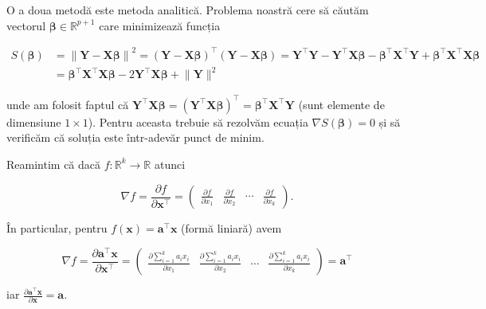 \documentclass[]{article}
\begin{document}
O a doua metodă este metoda analitică. Problema noastră cere să căutăm
vectorul \(\boldsymbol \beta\in\mathbb{R}^{p+1}\) care minimizează
funcția

\begin{align*}
S(\boldsymbol \beta) &= \left\lVert \boldsymbol Y - \boldsymbol X \boldsymbol\beta\right\rVert^2 = \left(\boldsymbol Y - \boldsymbol X \boldsymbol\beta\right)^\intercal\left(\boldsymbol Y - \boldsymbol X \boldsymbol\beta\right) = \boldsymbol Y^\intercal \boldsymbol Y - \boldsymbol Y^\intercal \boldsymbol X \boldsymbol\beta - \boldsymbol \beta^\intercal \boldsymbol X^\intercal \boldsymbol Y + \boldsymbol \beta^\intercal \boldsymbol X^\intercal \boldsymbol X \boldsymbol\beta \\
  & = \boldsymbol \beta^\intercal \boldsymbol X^\intercal \boldsymbol X \boldsymbol\beta - 2 \boldsymbol Y^\intercal \boldsymbol X \boldsymbol\beta + \lVert  \boldsymbol Y \rVert^2
\end{align*}

unde am folosit faptul că
\(\boldsymbol Y^\intercal \boldsymbol X \boldsymbol\beta = \left(\boldsymbol Y^\intercal \boldsymbol X \boldsymbol\beta\right)^\intercal = \boldsymbol \beta^\intercal \boldsymbol X^\intercal \boldsymbol Y\)
(sunt elemente de dimensiune \(1\times 1\)). Pentru aceasta trebuie să
rezolvăm ecuația \(\nabla S(\boldsymbol \beta) = 0\) și să verificăm că
soluția este într-adevăr punct de minim.

Reamintim că dacă \(f:\mathbb{R}^k\to\mathbb{R}\) atunci

\[
\nabla f = \frac{\partial f}{\partial \boldsymbol x^\intercal} = \begin{pmatrix}\frac{\partial f}{\partial x_1} & \frac{\partial f}{\partial x_2} & \cdots & \frac{\partial f}{\partial x_k}\end{pmatrix}.
\]

În particular, pentru
\(f(\boldsymbol x) = \boldsymbol a^\intercal \boldsymbol x\) (formă
liniară) avem

\[
  \nabla f = \frac{\partial \boldsymbol a^\intercal \boldsymbol x}{\partial \boldsymbol x^\intercal} = \begin{pmatrix}\frac{\partial \sum_{i=1}^{k}a_i x_i}{\partial x_1} & \frac{\partial \sum_{i=1}^{k}a_i x_i}{\partial x_2} & \cdots & \frac{\partial \sum_{i=1}^{k}a_i x_i}{\partial x_k}\end{pmatrix} = \boldsymbol a^\intercal
\]

iar
\(\frac{\partial \boldsymbol a^\intercal \boldsymbol x}{\partial \boldsymbol x} = \boldsymbol a\).
\end{document}
